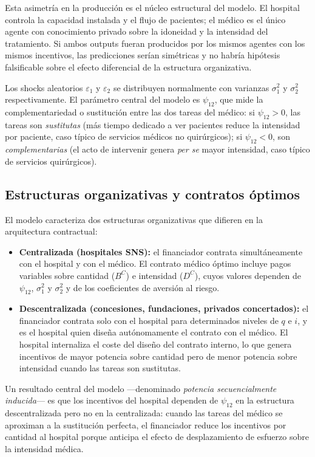 \documentclass[12pt, a4paper]{article}
\begin{document}
Esta asimetría en la producción es el núcleo estructural del modelo. El
hospital controla la capacidad instalada y el flujo de pacientes; el médico es
el único agente con conocimiento privado sobre la idoneidad y la intensidad del
tratamiento. Si ambos outputs fueran producidos por los mismos agentes con los
mismos incentivos, las predicciones serían simétricas y no habría hipótesis
falsificable sobre el efecto diferencial de la estructura organizativa.

Los shocks aleatorios $\varepsilon_1$ y $\varepsilon_2$ se distribuyen
normalmente con varianzas $\sigma_1^2$ y $\sigma_2^2$ respectivamente. El
parámetro central del modelo es $\psi_{12}$, que mide la complementariedad o
sustitución entre las dos tareas del médico: si $\psi_{12}>0$, las tareas son
\textit{sustitutas} (más tiempo dedicado a ver pacientes reduce la intensidad
por paciente, caso típico de servicios médicos no quirúrgicos); si
$\psi_{12}<0$, son \textit{complementarias} (el acto de intervenir genera
\textit{per se} mayor intensidad, caso típico de servicios quirúrgicos).

\subsection{Estructuras organizativas y contratos óptimos}

El modelo caracteriza dos estructuras organizativas que difieren en la
arquitectura contractual:

\begin{itemize}
  \item \textbf{Centralizada (hospitales SNS):} el financiador contrata
    simultáneamente con el hospital y con el médico. El contrato médico óptimo
    incluye pagos variables sobre cantidad ($B^C$) e intensidad ($D^C$), cuyos
    valores dependen de $\psi_{12}$, $\sigma_1^2$ y $\sigma_2^2$ y de los
    coeficientes de aversión al riesgo.
  \item \textbf{Descentralizada (concesiones, fundaciones, privados
    concertados):} el financiador contrata solo con el hospital para
    determinados niveles de $q$ e $i$, y es el hospital quien diseña
    autónomamente el contrato con el médico. El hospital internaliza el coste
    del diseño del contrato interno, lo que genera incentivos de mayor potencia
    sobre cantidad pero de menor potencia sobre intensidad cuando las tareas son
    sustitutas.
\end{itemize}

Un resultado central del modelo ---denominado \textit{potencia secuencialmente
inducida}--- es que los incentivos del hospital dependen de $\psi_{12}$ en la
estructura descentralizada pero no en la centralizada: cuando las tareas del
médico se aproximan a la sustitución perfecta, el financiador reduce los
incentivos por cantidad al hospital porque anticipa el efecto de desplazamiento
de esfuerzo sobre la intensidad médica.
\end{document}
